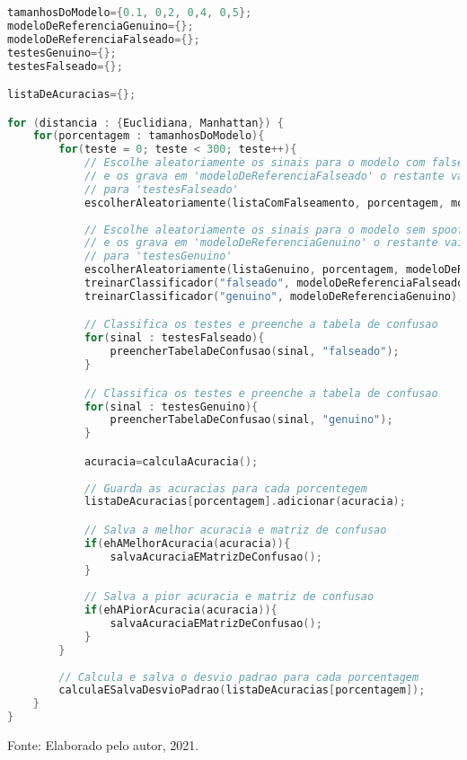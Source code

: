 \begin{lstlisting}[language=C++, caption={Algoritmo que caracteriza o procedimento 02}, captionpos=t,  label={lst:experiment02Algo}, belowskip=-0.8 \baselineskip]
tamanhosDoModelo={0.1, 0,2, 0,4, 0,5};
modeloDeReferenciaGenuino={};
modeloDeReferenciaFalseado={};
testesGenuino={};
testesFalseado={};

listaDeAcuracias={};

for (distancia : {Euclidiana, Manhattan}) {
	for(porcentagem : tamanhosDoModelo){
		for(teste = 0; teste < 300; teste++){
			// Escolhe aleatoriamente os sinais para o modelo com falseamento 
			// e os grava em 'modeloDeReferenciaFalseado' o restante vai 
			// para 'testesFalseado'
			escolherAleatoriamente(listaComFalseamento, porcentagem, modeloDeReferenciaFalseado, testesFalseado);
			
			// Escolhe aleatoriamente os sinais para o modelo sem spoofing
			// e os grava em 'modeloDeReferenciaGenuino' o restante vai 
			// para 'testesGenuino'
			escolherAleatoriamente(listaGenuino, porcentagem, modeloDeReferenciaGenuino, testesGenuino);
			treinarClassificador("falseado", modeloDeReferenciaFalseado);
			treinarClassificador("genuino", modeloDeReferenciaGenuino);

			// Classifica os testes e preenche a tabela de confusao
			for(sinal : testesFalseado){
				preencherTabelaDeConfusao(sinal, "falseado");
			} 

			// Classifica os testes e preenche a tabela de confusao
			for(sinal : testesGenuino){
				preencherTabelaDeConfusao(sinal, "genuino");
			}

			acuracia=calculaAcuracia();
			
			// Guarda as acuracias para cada porcentegem
			listaDeAcuracias[porcentagem].adicionar(acuracia);

			// Salva a melhor acuracia e matriz de confusao
			if(ehAMelhorAcuracia(acuracia)){
				salvaAcuraciaEMatrizDeConfusao();
			}
			
			// Salva a pior acuracia e matriz de confusao
			if(ehAPiorAcuracia(acuracia)){
				salvaAcuraciaEMatrizDeConfusao();
			}
		}
		
		// Calcula e salva o desvio padrao para cada porcentagem
		calculaESalvaDesvioPadrao(listaDeAcuracias[porcentagem]);
	}
}				
\end{lstlisting}
\begin{center}
	\par Fonte: Elaborado pelo autor, 2021.
\end{center}